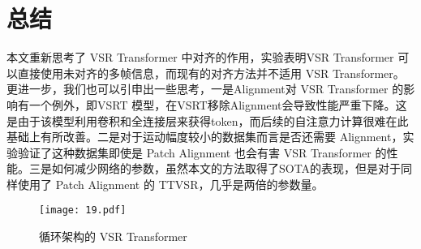 \section{总结}
本文重新思考了 VSR Transformer 中对齐的作用，实验表明VSR  Transformer 可以直接使用未对齐的多帧信息，而现有的对齐方法并不适用 VSR Transformer。更进一步，我们也可以引申出一些思考，一是Alignment对 VSR Transformer 的影响有一个例外，即VSRT 模型，在VSRT移除Alignment会导致性能严重下降。这是由于该模型利用卷积和全连接层来获得token，而后续的自注意力计算很难在此基础上有所改善。二是对于运动幅度较小的数据集而言是否还需要 Alignment，实验验证了这种数据集即使是 Patch Alignment 也会有害 VSR Transformer 的性能。三是如何减少网络的参数，虽然本文的方法取得了SOTA的表现，但是对于同样使用了 Patch Alignment 的 TTVSR，几乎是两倍的参数量。

\begin{figure*}[!htbp]
\centering
\texttt{[image: 19.pdf]}
	\caption{循环架构的 VSR Transformer}
\end{figure*}

